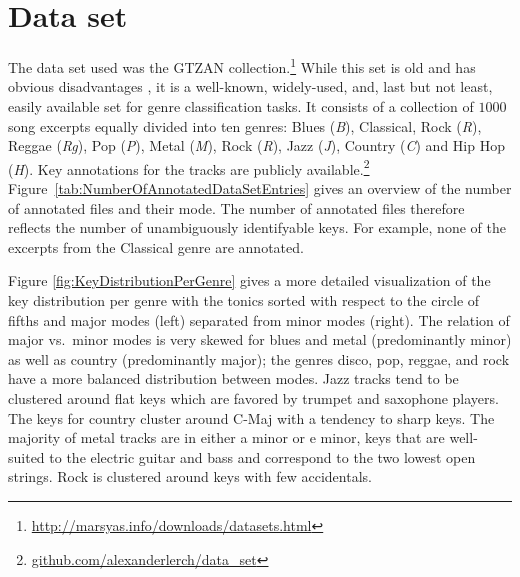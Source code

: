 \documentclass{article}
\begin{document}
\section{Data set}\label{sec:dataset}
The data set used was the GTZAN collection.\footnote{\url{http://marsyas.info/downloads/datasets.html}} While this set is old and has obvious disadvantages \cite{sturm_analysis_2012}, it is a well-known, widely-used, and, last but not least, easily available set for genre classification tasks. It consists of a collection of $1000$ song excerpts equally divided into ten genres: Blues (\textit{B}), Classical, Rock (\textit{R}), Reggae (\textit{Rg}), Pop (\textit{P}), Metal (\textit{M}), Rock (\textit{R}), Jazz (\textit{J}), Country (\textit{C}) and Hip Hop (\textit{H}). 
Key annotations for the tracks are publicly available.\footnote{\url{github.com/alexanderlerch/data_set}} Figure~\ref{tab:NumberOfAnnotatedDataSetEntries} gives an overview of the number of annotated files and their mode. The number of annotated files therefore reflects the number of unambiguously identifyable keys.
For example, none of the excerpts from the Classical genre are annotated. 

Figure \ref{fig:KeyDistributionPerGenre} gives a more detailed visualization of the key distribution per genre with the tonics sorted with respect to the circle of fifths and major modes (left) separated from minor modes (right). 
The relation of major vs.\ minor modes is very skewed for blues and metal (predominantly minor) as well as country (predominantly major); the genres disco, pop, reggae, and rock have a more balanced distribution between modes. Jazz tracks tend to be clustered around flat keys which are favored by trumpet and saxophone players. The keys for country cluster around C-Maj with a tendency to sharp keys. The majority of metal tracks are in either a minor or e minor, keys that are well-suited to the electric guitar and bass and correspond to the two lowest open strings. Rock is clustered around keys with few accidentals.

\end{document}
